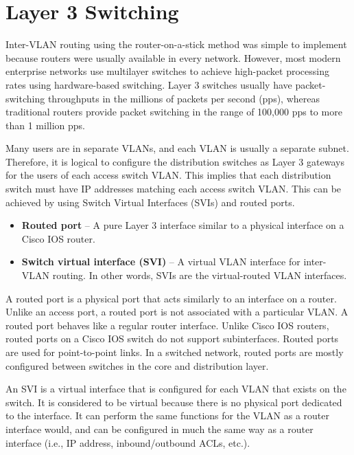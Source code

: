\chapter{Layer 3 Switching}
Inter-VLAN routing using the router-on-a-stick method was simple to implement because routers were usually available in every network. However, most modern enterprise networks use multilayer switches to achieve high-packet processing rates using hardware-based switching. Layer 3 switches usually have packet-switching throughputs in the millions of packets per second (pps), whereas traditional routers provide packet switching in the range of 100,000 pps to more than 1 million pps.\par 
Many users are in separate VLANs, and each VLAN is usually a separate subnet. Therefore, it is logical to configure the distribution switches as Layer 3 gateways for the users of each access switch VLAN. This implies that each distribution switch must have IP addresses matching each access switch VLAN. This can be achieved by using Switch Virtual Interfaces (SVIs) and routed ports.
\begin{itemize}
\item \textbf{Routed port} -- A pure Layer 3 interface similar to a physical interface on a Cisco IOS router.
\item \textbf{Switch virtual interface (SVI)} -- A virtual VLAN interface for inter-VLAN routing. In other words, SVIs are the virtual-routed VLAN interfaces.
\end{itemize}
A routed port is a physical port that acts similarly to an interface on a router. Unlike an access port, a routed port is not associated with a particular VLAN. A routed port behaves like a regular router interface. Unlike Cisco IOS routers, routed ports on a Cisco IOS switch do not support subinterfaces. Routed ports are used for point-to-point links.  In a switched network, routed ports are mostly configured between switches in the core and distribution layer. \par 
An SVI is a virtual interface that is configured for each VLAN that exists on the switch. It is considered to be virtual because there is no physical port dedicated to the interface. It can perform the same functions for the VLAN as a router interface would, and can be configured in much the same way as a router interface (i.e., IP address, inbound/outbound ACLs, etc.).